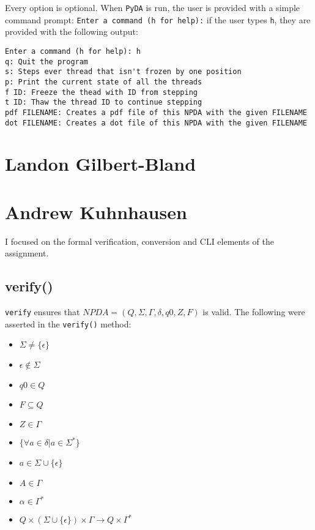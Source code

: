 \documentclass[a4paper]{report}
\begin{document}
Every option is optional. When \texttt{PyDA} is run, the user is provided with a
simple command prompt: \texttt{Enter a command (h for help):} if the user types
\texttt{h}, they are provided with the following output:
\begin{verbatim}
Enter a command (h for help): h
q: Quit the program
s: Steps ever thread that isn't frozen by one position
p: Print the current state of all the threads
f ID: Freeze the thead with ID from stepping
t ID: Thaw the thread ID to continue stepping
pdf FILENAME: Creates a pdf file of this NPDA with the given FILENAME
dot FILENAME: Creates a dot file of this NPDA with the given FILENAME
\end{verbatim}

\section*{Landon Gilbert-Bland}
\section*{Andrew Kuhnhausen}
I focused on the formal verification, conversion and CLI elements of the
assignment.
\subsection*{verify()}
\texttt{verify} ensures that $NPDA=(Q,\Sigma,\Gamma,\delta,q0,Z,F)$ is valid.
The following were asserted in the \texttt{verify()} method:
\begin{itemize}
    \item $\Sigma \ne \{\epsilon\}$
    \item $\epsilon \notin \Sigma$
    \item $q0\in Q$
    \item $F \subseteq Q$
    \item $Z \in \Gamma$
    \item $\{\forall a \in \delta | a \in \Sigma^{*}\}$
    \item $a\in\Sigma\cup\{\epsilon\}$
    \item $A\in\Gamma$
    \item $\alpha\in\Gamma^{*}$
    \item $Q\times(\Sigma\cup\{\epsilon\})\times\Gamma\rightarrow Q\times\Gamma^{*}$
\end{itemize}
\end{document}
